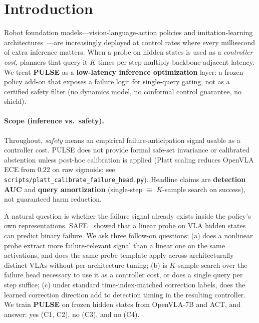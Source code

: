 \section{Introduction}

Robot foundation models---vision-language-action policies and imitation-learning architectures~\citep{openvla_paper, act_paper}---are increasingly deployed at control rates where every millisecond of extra inference matters. When a probe on hidden states is used as a \emph{controller cost}, planners that query it $K$ times per step multiply backbone-adjacent latency. We treat \textbf{PULSE} as a \textbf{low-latency inference optimization} layer: a frozen-policy add-on that exposes a failure logit for single-query gating, not as a certified safety filter (no dynamics model, no conformal control guarantee, no shield).

\paragraph{Scope (inference vs.\ safety).}
Throughout, \emph{safety} means an empirical failure-anticipation signal usable as a controller cost. PULSE does not provide formal safe-set invariance or calibrated abstention unless post-hoc calibration is applied (Platt scaling reduces OpenVLA ECE from $0.22$ on raw sigmoids; see \texttt{scripts/platt\_calibrate\_failure\_head.py}). Headline claims are \textbf{detection AUC} and \textbf{query amortization} (single-step $\equiv$ $K$-sample search on success), not guaranteed harm reduction.

A natural question is whether the failure signal already exists inside the policy's own representations. SAFE~\citep{safe_paper} showed that a linear probe on VLA hidden states can predict binary failure. We ask three follow-on questions: (a) does a nonlinear probe extract more failure-relevant signal than a linear one on the same activations, and does the same probe template apply across architecturally distinct VLAs without per-architecture tuning; (b) is $K$-sample search over the failure head necessary to use it as a controller cost, or does a single query per step suffice; (c) under standard time-index-matched correction labels, does the learned correction direction add to detection timing in the resulting controller. We train \textbf{PULSE} on frozen hidden states from OpenVLA-7B and ACT, and answer: yes (C1, C2), no (C3), and no (C4).

